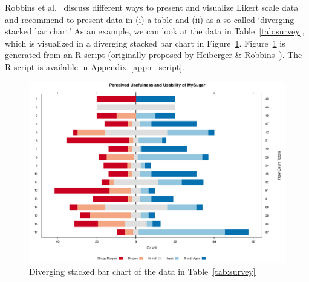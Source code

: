 Robbins et al.~\cite{robbins2011plotting} discuss different ways to present and visualize Likert scale data and recommend to present data in (i) a table and (ii) as a so-called `diverging stacked bar chart' As an example, we can look at the data in Table~\ref{tab:survey}, which is visualized in a diverging stacked bar chart in Figure~\ref{fig:chart}.
Figure~\ref{fig:chart} is generated from an R script (originally proposed by Heiberger \& Robbins~\cite{heiberger2014design}). The R script is available in Appendix~\ref{app:r_script}.





\begin{figure}[!ht]
    \centering
    \includegraphics[width=1.0\textwidth]{./images/survey_R_plot.pdf}
    \caption{Diverging stacked bar chart of the data in Table~\ref{tab:survey}}
    \label{fig:chart}
\end{figure}
